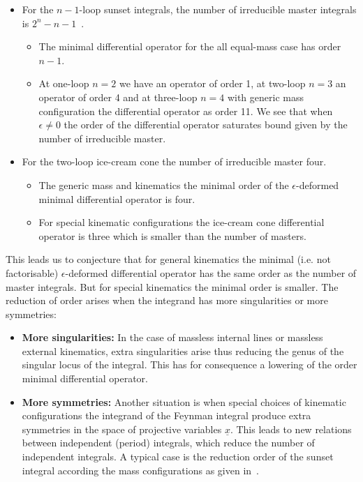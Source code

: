 \documentclass[a4paper,12pt]{article}
\numberwithin{equation}{section}
\numberwithin{figure}{section}
\begin{document}
\begin{itemize}
	\item  For the $n-1$-loop
	sunset integrals, the number of irreducible master integrals 
	is $2^{n}-n-1$~\cite{Kalmykov:2012rr,Bitoun:2017nre}. 
%
%	
	\begin{itemize}  \item The minimal differential operator for the all
		equal-mass case has order  $n-1$.
		\item At one-loop $n=2$ we have an operator of order 1, at two-loop
		$n=3$ an operator of order 4 and at three-loop $n=4$ with generic
		mass configuration the differential operator
		as   order 11.  We see that when $\epsilon\neq0$  the order of the
		differential operator saturates bound given by the number of
		irreducible master.
	\end{itemize}
	\item For the two-loop ice-cream cone the number of irreducible
          master four.
          \begin{itemize}
            \item The generic mass and kinematics the minimal order of the $\epsilon$-deformed minimal differential
	operator is four.
        \item For special kinematic configurations  the ice-cream cone
          differential operator  is three which is smaller than the
          number of masters.
        \end{itemize}
        \end{itemize}
This leads us to conjecture that 
 for general kinematics the minimal (i.e. not
factorisable) $\epsilon$-deformed differential operator has 
the same order
as the number of master integrals. But for special kinematics the minimal
order is smaller.
%
The reduction of order arises when the integrand has more
singularities or more symmetries:
\begin{itemize}
  \item {\bf More singularities:} In the case of
massless internal lines or massless external kinematics, extra
singularities arise thus reducing the genus of the
singular locus of the integral. This has for  consequence a lowering
of the order  minimal differential operator. 
\item {\bf More symmetries:}
Another situation is when special choices of kinematic
configurations the integrand of the Feynman integral produce extra
symmetries in the space of projective variables $\underline
x$. This leads to new relations between independent (period) integrals, which reduce the number of independent integrals. A typical case is the
reduction order of the sunset integral according the mass
configurations as given in~\cite{Bloch:2014qca,Lairez:2022zkj,Bonisch:2021yfw,Bonisch:2020qmm,Pogel:2022vat}.
\end{itemize}
\end{document}
